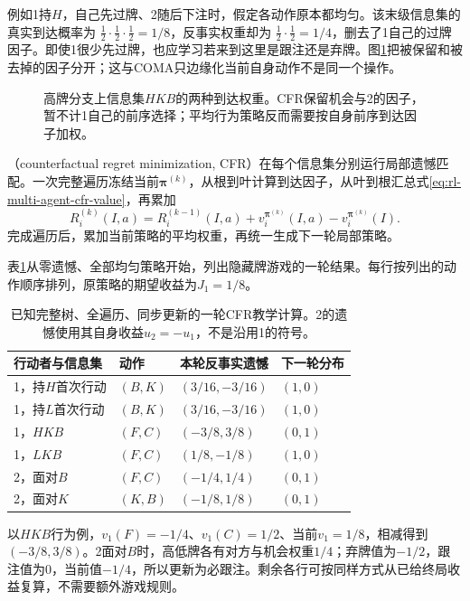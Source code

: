 例如1持$H$，自己先过牌、2随后下注时，假定各动作原本都均匀。该末级信息集的真实到达概率为
$\tfrac12\cdot\tfrac12\cdot\tfrac12=1/8$，反事实权重却为
$\tfrac12\cdot\tfrac12=1/4$，删去了1自己的过牌因子。即使1很少先过牌，也应学习若来到这里是跟注还是弃牌。图\ref{fig:rl-multi-agent-cfr-reach}把被保留和被去掉的因子分开；这与COMA只边缘化当前自身动作不是同一个操作。

\begin{figure}[htbp]
 \centering
 
 \caption{高牌分支上信息集$HKB$的两种到达权重。CFR保留机会与2的因子，暂不计1自己的前序选择；平均行为策略反而需要按自身前序到达因子加权。}
 \label{fig:rl-multi-agent-cfr-reach}
\end{figure}

（counterfactual regret minimization, CFR）在每个信息集分别运行局部遗憾匹配。一次完整遍历冻结当前$\bm\pi^{(k)}$，从根到叶计算到达因子，从叶到根汇总式\eqref{eq:rl-multi-agent-cfr-value}，再累加
\[
 R_i^{(k)}(I,a)=R_i^{(k-1)}(I,a)+
        v_i^{\bm\pi^{(k)}}(I,a)-v_i^{\bm\pi^{(k)}}(I).
\]
完成遍历后，累加当前策略的平均权重，再统一生成下一轮局部策略。

表\ref{tab:rl-multi-agent-cfr-round}从零遗憾、全部均匀策略开始，列出隐藏牌游戏的一轮结果。每行按列出的动作顺序排列，原策略的期望收益为$J_1=1/8$。

\begin{table}[htbp]
 \centering
 \begin{tabular}{@{}llll@{}}
 \toprule
 行动者与信息集 & 动作 & 本轮反事实遗憾 & 下一轮分布\\
 \midrule
 1，持$H$首次行动 & $(B,K)$ & $(3/16,-3/16)$ & $(1,0)$\\
 1，持$L$首次行动 & $(B,K)$ & $(3/16,-3/16)$ & $(1,0)$\\
 1，$HKB$ & $(F,C)$ & $(-3/8,3/8)$ & $(0,1)$\\
 1，$LKB$ & $(F,C)$ & $(1/8,-1/8)$ & $(1,0)$\\
 2，面对$B$ & $(F,C)$ & $(-1/4,1/4)$ & $(0,1)$\\
 2，面对$K$ & $(K,B)$ & $(-1/8,1/8)$ & $(0,1)$\\
 \bottomrule
 \end{tabular}
 \caption{已知完整树、全遍历、同步更新的一轮CFR教学计算。2的遗憾使用其自身收益$u_2=-u_1$，不是沿用1的符号。}
 \label{tab:rl-multi-agent-cfr-round}
\end{table}

以$HKB$行为例，$v_1(F)=-1/4$、$v_1(C)=1/2$、当前$v_1=1/8$，相减得到$(-3/8,3/8)$。2面对$B$时，高低牌各有对方与机会权重$1/4$；弃牌值为$-1/2$，跟注值为0，当前值$-1/4$，所以更新为必跟注。剩余各行可按同样方式从已给终局收益复算，不需要额外游戏规则。

